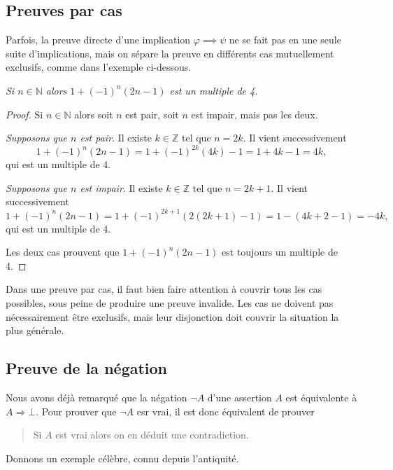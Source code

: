 \documentclass[french,course,oneside,theoremnosection]{lecture}
\newcommand{\N}{\mathbb{N}}
\newcommand{\Z}{\mathbb{Z}}
\newcommand{\iimplies}{\Rightarrow}
\begin{document}
\subsection{Preuves par cas}

Parfois, la preuve directe d'une implication $\varphi \implies \psi$ ne se fait pas en une seule suite d'implications, mais on sépare la preuve en différents cas mutuellement exclusifs, comme dans l'exemple ci-dessous.
\begin{example}
\emph{Si $n\in \N$ alors $1+(-1)^n(2n-1)$ est un multiple de 4}.
\end{example}
\begin{proof}
Si $n\in \N$ alors soit $n$ est pair, soit $n$ est impair, mais pas les deux.

 \emph{Supposons que $n$ est pair}. Il existe $k\in \Z$ tel que $n=2k$. Il vient successivement
\[
1+(-1)^n(2n-1)=1+(-1)^{2k}(4k)-1=1+4k-1=4k,
\]
qui est un multiple de $4$.

 \emph{Supposons que $n$ est impair}. Il existe $k\in \Z$ tel que $n=2k+1$. Il vient successivement
\[
1+(-1)^n(2n-1)=1+(-1)^{2k+1}(2(2k+1)-1)=1-(4k+2-1)=-4k,
\]
qui est un multiple de 4.

Les deux cas prouvent que $1+(-1)^n(2n-1)$ est toujours un multiple de 4.
\end{proof}
\begin{remark}
Dans une preuve par cas, il faut bien faire attention à couvrir tous les cas possibles, sous peine de produire une preuve invalide. Les cas ne doivent pas nécessairement être exclusifs, mais leur disjonction doit couvrir la situation la plus générale. 
\end{remark}

\subsection{Preuve de la négation}
Nous avons déjà remarqué que la négation $\neg A$ d'une assertion $A$ est équivalente à $A \iimplies  \bot$. Pour prouver que $\neg A$ esr vrai, il est donc équivalent de prouver
\begin{quotation}
Si $A$ est vrai alors on en déduit une contradiction.
\end{quotation}
Donnons un exemple célèbre, connu depuis l'antiquité.
\end{document}
